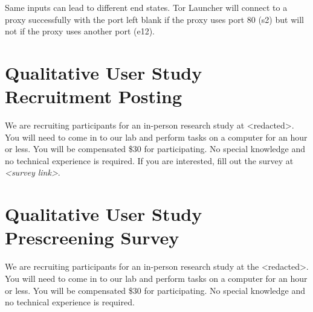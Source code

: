 \documentclass[USenglish,oneside,twocolumn]{article}
\begin{document}
Same inputs can lead to different end states. Tor Launcher will connect to a proxy successfully with the port left blank if the proxy uses port 80 (s2) but will not if the proxy uses another port (e12). 

\section{Qualitative User Study Recruitment Posting} 
\label{qualitative-recruitment}
We are recruiting participants for an in-person research study at <redacted>. %
You will need to come in to our lab and perform tasks on a computer for an hour or less. You will be compensated \$30 for participating. 
No special knowledge and no technical experience is required. If you are interested, fill out the survey at \textit{<survey link>}. 

\section{Qualitative User Study Prescreening Survey} 
\label{qualitative-prescreening}
We are recruiting participants for an in-person research study at the <redacted>. %
You will need to come in to our lab and perform tasks on a computer for an hour or less. You will be compensated \$30 for participating. No special knowledge and no technical experience is required.\\
\end{document}
